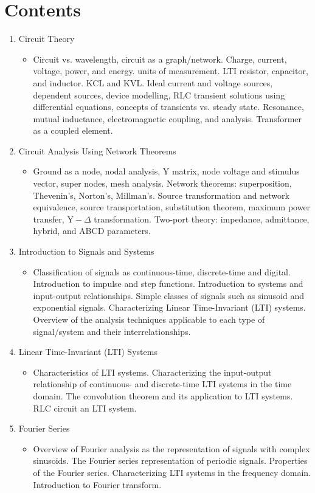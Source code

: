 \documentclass[11pt, a4paper]{article}
\newcommand{\sectioncolor}{\color{SteelBlue} \usefont{OT1}{lmss}{m}{n}}
\begin{document}
\section{\sectioncolor Contents}
\begin{enumerate}
  \item Circuit Theory 
  \begin{itemize}
    \item[] Circuit vs. wavelength, circuit as a graph/network. Charge, current, voltage, power, and energy. units of measurement. LTI resistor, capacitor, and inductor. KCL and KVL. Ideal current and voltage sources, dependent sources, device modelling, RLC transient solutions using differential equations, concepts of transients vs. steady state. Resonance, mutual inductance, electromagnetic coupling, and analysis. Transformer as a coupled element.
  \end{itemize}
  \item Circuit Analysis Using Network Theorems
  \begin{itemize}
    \item[] Ground as a node, nodal analysis, Y matrix, node voltage and stimulus vector, super nodes, mesh analysis. Network theorems: superposition, Thevenin’s, Norton’s, Millman’s. Source transformation and network equivalence, source transportation, substitution theorem, maximum power transfer, $\mathrm{Y}-\Delta$ transformation. Two-port theory: impedance, admittance, hybrid, and ABCD parameters.
  \end{itemize}
  \item Introduction to Signals and Systems 
  \begin{itemize}
    \item[] Classification of signals as continuous-time, discrete-time and digital. Introduction to impulse and step functions. Introduction to systems and input-output relationships. Simple classes of signals such as sinusoid and exponential signals. Characterizing Linear Time-Invariant (LTI) systems. Overview of the analysis techniques applicable to each type of signal/system and their interrelationships.
  \end{itemize}
  \item Linear Time-Invariant (LTI) Systems
  \begin{itemize}
    \item[] Characteristics of LTI systems. Characterizing the input-output relationship of continuous- and discrete-time LTI systems in the time domain. The convolution theorem and its application to LTI systems. RLC circuit an LTI system.
  \end{itemize}
  \item Fourier Series
  \begin{itemize}
    \item[] Overview of Fourier analysis as the representation of signals with complex sinusoids. The Fourier series representation of periodic signals. Properties of the Fourier series. Characterizing LTI systems in the frequency domain. Introduction to Fourier transform.
  \end{itemize}
\end{enumerate}
\end{document}
